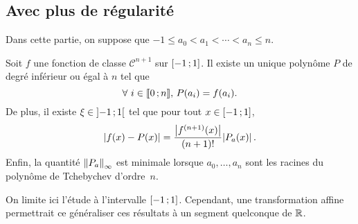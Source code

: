 \subsection{Avec plus de régularité}

Dans cette partie, on suppose que $-1 \leq a_0 < a_1 < \cdots < a_n \leq n$.

\begin{theo}
Soit $f$ une fonction de classe $\mathscr{C}^{n+1}$ sur $\left[-1\,;1\right]$. Il existe un unique polynôme $P$ de degré inférieur ou égal à $n$ tel que
\[
\forall\, i \in \interent{0}{n},\, P(a_i) = f(a_i).
\]
De plus, il existe $\xi \in \left]-1\,;1\right[$ tel que pour tout $x \in \left[-1\,;1\right]$,
\[
\mathopen{}\left| f(x) - P(x) \right| = \frac{\mathopen{}\left| f^{(n+1)}(x) \right|}{(n+1)!} \mathopen{}\left| P_a(x) \right|.
\]
Enfin, la quantité $\norm{P_a}_\infty$ est minimale lorsque $a_0,\ldots,a_n$ sont les racines du polynôme de Tchebychev d'ordre~$n$.
\end{theo}

\begin{remarque}
On limite ici l'étude à l'intervalle $\left[-1\,;1\right]$. Cependant, une transformation affine permettrait ce généraliser ces résultats à un segment quelconque de $\mathbb{R}$.
\end{remarque}


